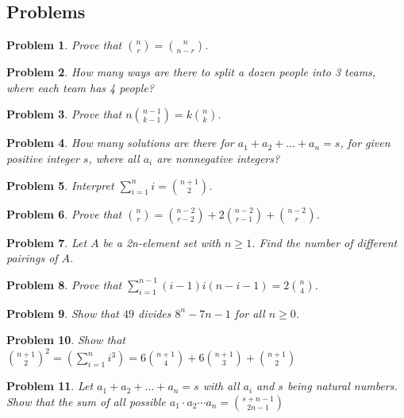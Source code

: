 \documentclass[11pt,a5paper]{article}
\newtheorem{problem}{Problem}
\begin{document}
\subsection*{Problems}

\begin{problem}
Prove that ${n \choose r} = {n \choose n - r}$.
\end{problem}

\begin{problem}
How many ways are there to split a dozen people into 3 teams, where each team has 4 people?
\end{problem}

\begin{problem}
Prove that $n{n-1 \choose k-1}= k{n \choose k}$.
\end{problem}

\begin{problem}
How many solutions are there for $a_1 + a_2 + \dots + a_n = s$, for given positive integer $s$, where all $a_i$ are nonnegative integers?
\end{problem}

\begin{problem}
Interpret $\sum_{i=1}^{n} i = {n+1 \choose 2}$.
\end{problem}

\begin{problem}
Prove that ${n \choose r} = {n - 2 \choose r - 2} + 2{n - 2 \choose r - 1} + {n - 2 \choose r}$.
\end{problem}

\begin{problem}
Let $A$ be a \textit{2n}-element set with $n \ge 1$. Find the number of different pairings of $A$.
\end{problem}

\begin{problem}
Prove that $\sum_{i=1}^{n-1} (i - 1)i(n-i-1) = 2{n \choose 4}$.
\end{problem}

\begin{problem}
Show that $49$ divides $8^n - 7n - 1$ for all $n \ge 0$.
\end{problem}

\begin{problem}
Show that ${n+1 \choose 2}^2 = (\sum_{i=1}^n i^3) = 6{n+1 \choose 4} + 6{n+1 \choose 3} + {n+1 \choose 2}$
\end{problem}

\begin{problem}
Let $a_1 + a_2 + \dots + a_n = s$ with all $a_i$ and $s$ being natural numbers. Show that the sum of all possible $a_1 \cdot a_2 \cdots a_n = {s + n - 1 \choose 2n - 1}$
\end{problem}
\end{document}
